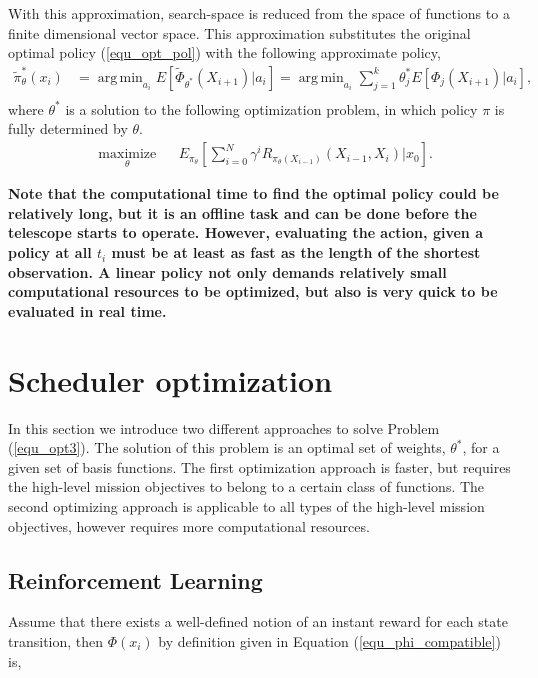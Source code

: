 \documentclass[12pt]{aastex62}
\theoremstyle{definition}
\DeclareMathOperator*{\argmin}{arg\,min}
\begin{document}
With this approximation, search-space is reduced from the space of functions to a finite dimensional vector space. This approximation substitutes the original optimal policy (\ref{equ_opt_pol}) with the following approximate policy,
%
\begin{equation}\label{equ_approx_pol}
\begin{aligned}
\tilde{\pi}_{\theta}^*(x_{i})& = \argmin_{a_{i}} E[ \tilde{\Phi}_{\theta^*}(X_{i+1}) | a_{i}] =  \argmin_{a_{i}} \sum_{j=1}^k \theta^*_j E[\Phi_j(X_{i+1}) | a_{i}],\\
\end{aligned}
\end{equation}
%
where $\theta^*$ is a solution to the following optimization problem, in which policy $\pi$ is fully determined by $\theta$.
%
\begin{equation}\label{equ_opt3}
\begin{aligned}
& \underset{\theta}{\text{maximize}}
& & E_{\pi_{\theta}}[\sum_{i=0}^N \gamma^i R_{\pi_{\theta} (X_{i-1})}(X_{{i-1}}, X_{i}) | x_0].
\end{aligned}
\end{equation}

{\bf Note that the computational time to find the optimal policy could be relatively long, but it is an offline task and can be done before the telescope starts to operate. However, evaluating the action, given a policy at all $t_i$ must be at least as fast as the length of the shortest observation. A linear policy not only demands relatively small computational resources to be optimized, but also is very quick to be evaluated in real time.\bf}

\section{Scheduler optimization}\label{sec_opt}
In this section we introduce two different approaches to solve Problem (\ref{equ_opt3}). The solution of this problem is an optimal set of weights, $\theta^*$, for a given set of basis functions. The first optimization approach is faster, but requires the high-level mission objectives to belong to a certain class of functions. The second optimizing approach is applicable to all types of the high-level mission objectives, however requires more computational resources. 

\subsection{Reinforcement Learning}
Assume that there exists a well-defined notion of an instant reward for each state transition, then $\Phi(x_{{i}})$ by definition given in Equation (\ref{equ_phi_compatible}) is,
\end{document}
